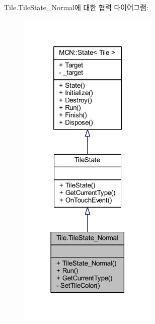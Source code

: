 Tile.\+Tile\+State\+\_\+\+Normal에 대한 협력 다이어그램\+:\nopagebreak
\begin{figure}[H]
\begin{center}
\leavevmode
\includegraphics[width=189pt]{class_tile_1_1_tile_state___normal__coll__graph}
\end{center}
\end{figure}
